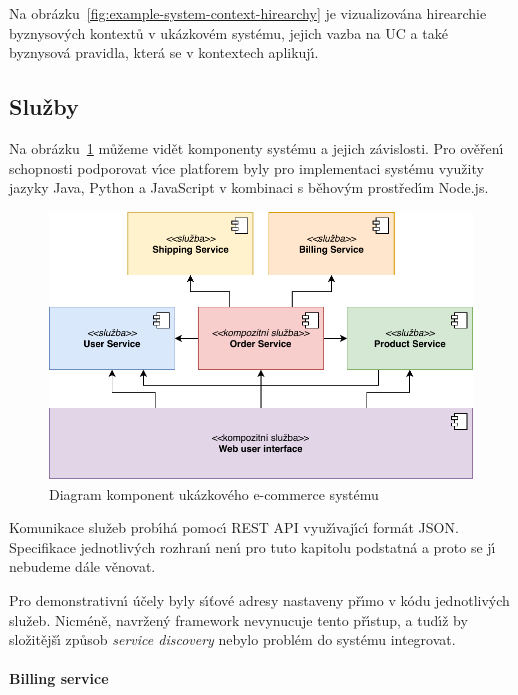 Na obrázku~\ref{fig:example-system-context-hirearchy} je vizualizována
hirearchie byznysov\'ych kontextů v ukázkovém systému, jejich vazba na \gls{UC}
a také byznysová pravidla, která se v kontextech aplikuj\'{\i}.

\subsection{Služby}

Na obrázku~\ref{fig:example-system} můžeme vidět komponenty systému a jejich závislosti.
Pro ověřen\'{\i} schopnosti podporovat v\'{\i}ce platforem byly pro implementaci systému využity
jazyky Java, Python a JavaScript v kombinaci s běhov\'ym prostřed\'{\i}m Node.js.

\begin{figure}
    \centering
    \includegraphics[keepaspectratio=true, width=0.8\linewidth]{figures/example-system.pdf}
    \caption{Diagram komponent ukázkového e-commerce systému}
    \label{fig:example-system}
\end{figure}

Komunikace služeb prob\'{\i}há pomoc\'{\i} \gls{REST} \gls{API} využ\'{\i}vaj\'{\i}c\'{\i} formát \gls{JSON}.
Specifikace jednotliv\'ych rozhran\'{\i} nen\'{\i} pro tuto kapitolu podstatná a proto se
j\'{\i} nebudeme dále věnovat.

Pro demonstrativn\'{\i} účely byly s\'{\i}ťové adresy nastaveny př\'{\i}mo v kódu jednotliv\'ych
služeb. Nicméně, navržen\'y framework nevynucuje tento př\'{\i}stup, a tud\'{\i}ž by složitějš\'{\i}
způsob \textit{service discovery} nebylo problém do systému integrovat.

\paragraph{Billing service}

